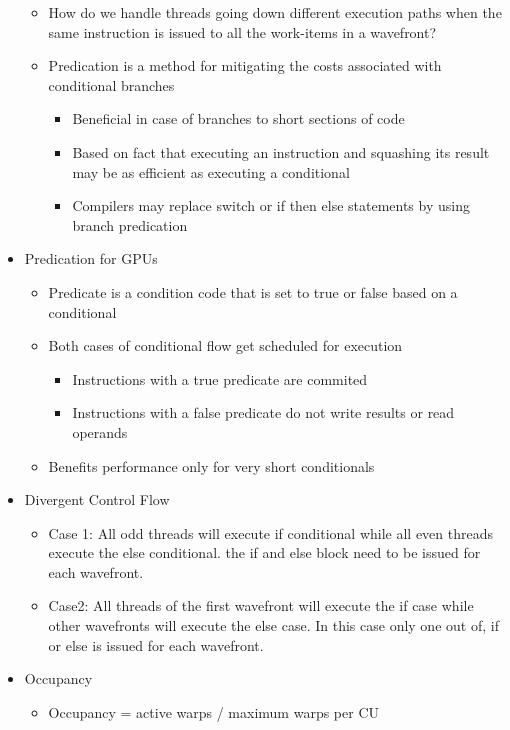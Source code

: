 \documentclass[paper=a4, fontsize=11pt]{scrartcl} %
\numberwithin{equation}{section} %
\numberwithin{figure}{section} %
\numberwithin{table}{section} %
\begin{document}
\begin{itemize}
  \begin{itemize}
    \item How do we handle threads going down different execution paths when the same instruction is issued to all the work-items in a wavefront?
    \item Predication is a method for mitigating the costs associated with conditional branches
    \begin{itemize}
      \item Beneficial in case of branches to short sections of code
      \item Based on fact that executing an instruction and squashing its result may be as efficient as executing a conditional
      \item Compilers may replace switch or if then else statements by using branch predication
    \end{itemize}
  \end{itemize}
  \item Predication for GPUs
  \begin{itemize}
    \item Predicate is a condition code that is set to true or false based on a conditional
    \item Both cases of conditional flow get scheduled for execution
    \begin{itemize}
      \item Instructions with a true predicate are commited
      \item Instructions with a false predicate do not write results or read operands
    \end{itemize}
    \item Benefits performance only for very short conditionals
  \end{itemize}
  \item Divergent Control Flow
  \begin{itemize}
    \item Case 1: All odd threads will execute if conditional while all even threads execute the else conditional. the if and else block need to be issued for each wavefront.
    \item Case2: All threads of the first wavefront will execute the if case while other wavefronts will execute the else case. In this case only one out of, if or else is issued for each wavefront.
  \end{itemize}
  \item Occupancy
  \begin{itemize}
    \item Occupancy = active warps / maximum warps per CU

\end{itemize}
\end{itemize}
\end{document}
